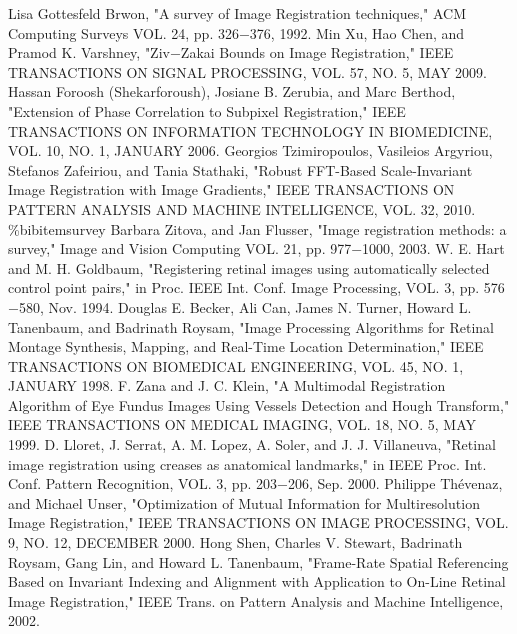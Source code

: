 \begin{thebibliography}{300}
 Lisa Gottesfeld Brwon, "A survey of Image Registration techniques," ACM
Computing Surveys VOL. 24, pp.  326$-$376, 1992.%
 Min Xu, Hao Chen, and Pramod K. Varshney, "Ziv$-$Zakai Bounds on Image Registration," IEEE TRANSACTIONS ON SIGNAL PROCESSING, VOL. 57, NO. 5, MAY 2009.
 Hassan Foroosh (Shekarforoush), Josiane B. Zerubia, and Marc Berthod, "Extension of Phase Correlation to Subpixel Registration," IEEE TRANSACTIONS ON INFORMATION TECHNOLOGY IN BIOMEDICINE, VOL. 10, NO. 1, JANUARY 2006. %
 Georgios Tzimiropoulos, Vasileios Argyriou, Stefanos Zafeiriou, and Tania Stathaki, "Robust FFT-Based Scale-Invariant Image Registration with Image Gradients," IEEE TRANSACTIONS ON PATTERN ANALYSIS AND MACHINE INTELLIGENCE, VOL. 32, 2010.%
\%bibitem{survey} Barbara Zitova, and Jan Flusser, "Image registration methods: a survey," Image and Vision Computing VOL. 21, pp. 977$-$1000, 2003.%
 W. E. Hart and M. H. Goldbaum, "Registering retinal images using automatically selected control point pairs," in Proc. IEEE Int. Conf. Image Processing, VOL. 3, pp. 576$-$580, Nov. 1994.%
 Douglas E. Becker, Ali Can, James N. Turner, Howard L. Tanenbaum, and Badrinath Roysam, "Image Processing Algorithms for Retinal Montage Synthesis, Mapping, and Real-Time Location Determination," IEEE TRANSACTIONS ON BIOMEDICAL ENGINEERING, VOL. 45, NO. 1, JANUARY 1998.%
 F. Zana and J. C. Klein, "A Multimodal Registration Algorithm of Eye Fundus Images Using Vessels Detection and Hough Transform," IEEE TRANSACTIONS ON MEDICAL IMAGING, VOL. 18, NO. 5, MAY 1999.%
 D. Lloret, J. Serrat, A. M. Lopez, A. Soler, and J. J. Villaneuva, "Retinal image registration using creases as anatomical landmarks," in IEEE Proc. Int. Conf. Pattern Recognition, VOL. 3, pp. 203$-$206, Sep. 2000. %
 Philippe Thévenaz, and Michael Unser, "Optimization of Mutual Information for Multiresolution Image Registration," IEEE TRANSACTIONS ON IMAGE PROCESSING, VOL. 9, NO. 12, DECEMBER 2000.%
 Hong Shen, Charles V. Stewart, Badrinath Roysam, Gang Lin, and Howard L. Tanenbaum, "Frame-Rate Spatial Referencing Based on Invariant Indexing and Alignment with Application to On-Line Retinal Image Registration," IEEE Trans. on Pattern Analysis and Machine Intelligence, 2002.%

\end{thebibliography}
